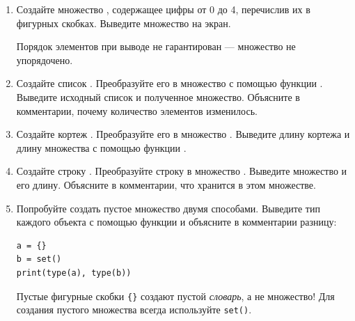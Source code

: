 \documentclass[a4,12pt]{article}
\theoremstyle{remark}
\begin{document}
\begin{enumerate}

    \item Создайте множество {}, содержащее цифры от 0 до 4, перечислив их в фигурных скобках. Выведите множество на экран.

    \begin{exercisecomment}
    Порядок элементов при выводе не гарантирован --- множество не упорядочено.
    \end{exercisecomment}

    \item Создайте список {}. Преобразуйте его в множество {} с помощью функции {}. Выведите исходный список и полученное множество. Объясните в комментарии, почему количество элементов изменилось.

    \item Создайте кортеж {}. Преобразуйте его в множество {}. Выведите длину кортежа и длину множества с помощью функции {}.

    \item Создайте строку {}. Преобразуйте строку в множество {}. Выведите множество и его длину. Объясните в комментарии, что хранится в этом множестве.

    \item Попробуйте создать пустое множество двумя способами. Выведите тип каждого объекта с помощью функции {} и объясните в комментарии разницу:

    \begin{inputformat}
    \begin{verbatim}
a = {}
b = set()
print(type(a), type(b))
    \end{verbatim}
    \end{inputformat}

    \begin{exercisenote}
    Пустые фигурные скобки \texttt{\{\}} создают пустой \emph{словарь}, а не множество!
    Для создания пустого множества всегда используйте \texttt{set()}.
    \end{exercisenote}

\end{enumerate}
\end{document}
